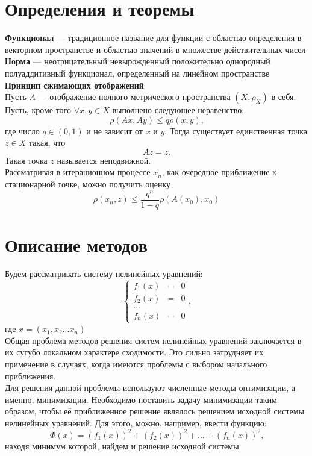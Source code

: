 \documentclass[a4paper, 12pt]{article}
\begin{document}
\section*{Определения и теоремы}
\textbf{Функционал} --- традиционное название для функции с областью определения в векторном пространстве и областью значений в множестве действительных чисел\\
\textbf{Норма} --- неотрицательный невырожденный положительно однородный полуаддитивный функционал, определенный на линейном пространстве \\
\textbf{Принцип сжимающих отображений}\\
Пусть $A$ --- отображение полного метрического пространства $(X,\rho_X)$ в себя. Пусть, 
кроме того $\forall x,y \in X$ выполнено следующее неравенство:
\begin{equation}
	\rho (Ax,Ay) \leq q \rho(x,y) \text{,}
\end{equation}
где число $q \in (0,1)$ и не зависит от $x$ и $y$. Тогда существует единственная точка 
$z \in X$ такая, что
\begin{equation}
	Az = z \text{.}
\end{equation}
Такая точка $z$ называется неподвижной.\\
Рассматривая в итерационном процессе $x_n$, как очередное приближение к стационарной точке, можно получить оценку
\begin{equation}
	\rho (x_n,z) \leq \frac{q^n}{1-q} \rho(A(x_0),x_0)
\end{equation}
\nocite{BH}

\newpage
\section*{Описание методов}
Будем рассматривать систему нелинейных уравнений:
\[
\left\{
\begin{array}{ccc}	f_1(x) & = &  0\\
	f_2(x) & = &  0\\
	\ldots \\
	f_n(x) & = &  0 
\end{array}
\text{,}
\right.
\]
где $x = (x_1, x_2 \ldots x_n)$\\
Общая проблема методов решения систем нелинейных уравнений заключается в их сугубо локальном
характере сходимости. Это сильно затрудняет их применение в случаях, когда имеются проблемы с 
выбором начального приближения.\\
Для решения данной проблемы используют численные методы оптимизации, а именно, минимизации.
Необходимо поставить задачу минимизации таким образом, чтобы её приближенное решение являлось решением 
исходной системы нелинейных уравнений. Для этого, можно, например, ввести функцию:
\begin{equation*}
	\Phi(x) = (f_1(x))^2 + (f_2(x))^2 + \ldots + (f_n(x))^2 \text{,}
\end{equation*}
находя минимум которой, найдем и решение исходной системы. 
\end{document}
